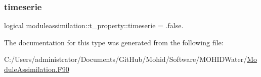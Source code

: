 \subsubsection{\texorpdfstring{timeserie}{timeserie}}
{\footnotesize\ttfamily logical moduleassimilation\+::t\+\_\+property\+::timeserie = .false.\hspace{0.3cm}{\ttfamily [private]}}



The documentation for this type was generated from the following file\+:\begin{DoxyCompactItemize}
\item 
C\+:/\+Users/administrator/\+Documents/\+Git\+Hub/\+Mohid/\+Software/\+M\+O\+H\+I\+D\+Water/\mbox{\hyperlink{_module_assimilation_8_f90}{Module\+Assimilation.\+F90}}\end{DoxyCompactItemize}
